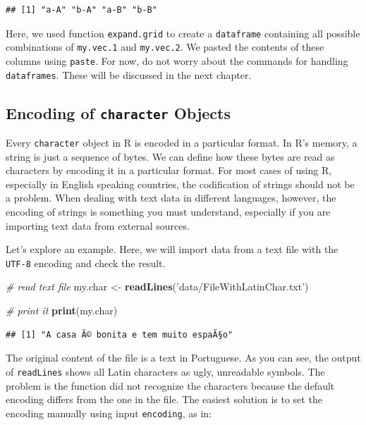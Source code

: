 \documentclass[11pt,]{book}
\newenvironment{Shaded}{\begin{snugshade}}{\end{snugshade}}
\newcommand{\KeywordTok}[1]{\textcolor[rgb]{0.27,0.27,0.27}{\textbf{#1}}}
\newcommand{\StringTok}[1]{\textcolor[rgb]{0.5,0.5,0.5}{#1}}
\newcommand{\CommentTok}[1]{\textcolor[rgb]{0.56,0.35,0.01}{\textit{#1}}}
\newcommand{\NormalTok}[1]{#1}
\begin{document}
\begin{verbatim}
## [1] "a-A" "b-A" "a-B" "b-B"
\end{verbatim}

Here, we used function \texttt{expand.grid} to create a
\texttt{dataframe} containing all possible combinations of
\texttt{my.vec.1} and \texttt{my.vec.2}. We pasted the contents of these
columns using \texttt{paste}. For now, do not worry about the commands
for handling \texttt{dataframes}. These will be discussed in the next
chapter.

\subsection{\texorpdfstring{Encoding of \texttt{character}
Objects}{Encoding of character Objects}}\label{encoding-of-character-objects}

Every \texttt{character} object in R is encoded in a particular format.
In R's memory, a string is just a sequence of bytes. We can define how
these bytes are read as characters by encoding it in a particular
format. For most cases of using R, especially in English speaking
countries, the codification of strings should not be a problem. When
dealing with text data in different languages, however, the encoding of
strings is something you must understand, especially if you are
importing text data from external sources.

Let's explore an example. Here, we will import data from a text file
with the \texttt{UTF-8} encoding and check the result.

\begin{Shaded}
\begin{Highlighting}[]
\CommentTok{# read text file }
\NormalTok{my.char <-}\StringTok{ }\KeywordTok{readLines}\NormalTok{(}\StringTok{'data/FileWithLatinChar.txt'}\NormalTok{)}

\CommentTok{# print it}
\KeywordTok{print}\NormalTok{(my.char)}
\end{Highlighting}
\end{Shaded}

\begin{verbatim}
## [1] "A casa Ã© bonita e tem muito espaÃ§o"
\end{verbatim}

The original content of the file is a text in Portuguese. As you can
see, the output of \texttt{readLines} shows all Latin characters as
ugly, unreadable symbols. The problem is the function did not recognize
the characters because the default encoding differs from the one in the
file. The easiest solution is to set the encoding manually using input
\texttt{encoding}, as in:
\end{document}
